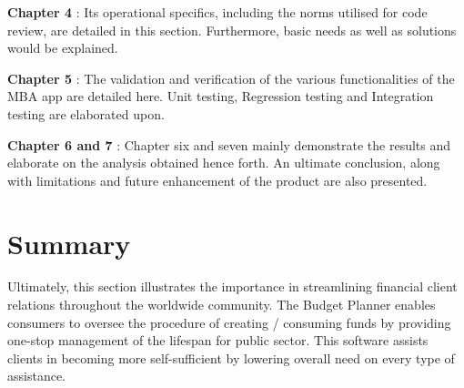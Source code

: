 {\bf Chapter 4} : Its operational specifics, including the norms utilised for code review, are
detailed in this section. Furthermore, basic needs as well as solutions would be explained.

{\bf Chapter 5} : The validation and verification of the various functionalities of the MBA app are
detailed here. Unit testing, Regression testing and Integration testing are elaborated upon.

{\bf Chapter 6 and 7} : Chapter six and seven mainly demonstrate the results and elaborate on the
analysis obtained hence forth. An ultimate conclusion, along with limitations and future
enhancement of the product are also presented.

\section{Summary}
Ultimately, this section illustrates the importance in streamlining financial client relations
throughout the worldwide community. The Budget Planner enables consumers to
oversee the procedure of creating / consuming funds by providing one-stop
management of the lifespan for public sector. This software assists clients in becoming
more self-sufficient by  lowering overall need on every type of assistance.







